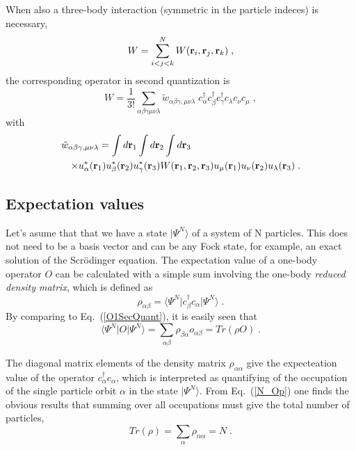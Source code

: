 When also a three-body interaction (symmetric in the particle indeces) is necessary,
\begin{equation}
 W = \sum_{i < j < k}^N W({\bf r}_i, {\bf r}_j, {\bf r}_k) \; ,
\label{W3}
\end{equation}
the corresponding operator in second quantization is
\begin{equation}
 W = \frac{1}{3!} \sum_{\alpha \beta \gamma \mu \nu \lambda}
    {\tilde w}_{\alpha \beta \gamma, \mu \nu \lambda}
      \; c^\dag_\alpha c^\dag_\beta c^\dag_\gamma  c_\lambda c_\nu c_\mu \; ,
\label{W3SecQuant}
\end{equation}
with
\begin{eqnarray}
\lefteqn{
 {\tilde w}_{\alpha \beta \gamma, \mu \nu \lambda} =
  \int d{\bf r}_1 \int d{\bf r}_2 \int d{\bf r}_3
} & &
\nonumber \\
 & & \times u^*_\alpha({\bf r}_1) u^*_\beta({\bf r}_2) u^*_\gamma({\bf r}_3)
             W({\bf r}_1, {\bf r}_2, {\bf r}_3) 
                 u_\mu({\bf r}_1) u_\nu({\bf r}_2) u_\lambda({\bf r}_3) \; .
\label{W3me} \\
\end{eqnarray}


\subsection{Expectation values}


Let's asume that that we have a state $\vert\Psi^N\rangle$ of a system of N particles. This does not need to be a basis vector and can be any Fock state, for example, an exact solution of the Scr\"odinger equation. The expectation value of a one-body operator $O$ can be calculated with a simple sum involving the one-body {\em reduced density matrix}, which is defined as
\begin{equation}
\rho_{\alpha \beta} = \langle \Psi^N\vert c^\dag_\beta c_\alpha \vert\Psi^N\rangle \; .
\label{OBRDM}
\end{equation}
By comparing to Eq.~(\ref{O1SecQuant}), it is easily seen that
\begin{equation}
\langle \Psi^N\vert O \vert\Psi^N\rangle = \sum_{\alpha \beta} \rho_{\beta \alpha}  o_{\alpha \beta} =
  Tr\left( \rho O \right)  \; .
\label{RhoExpVal}
\end{equation}

The diagonal matrix elements of the density matrix $\rho_{\alpha \alpha}$ give the expecteation value of the operator $c^\dag_\alpha c_\alpha$, which is interpreted as quantifying of the occupation of the single particle orbit $\alpha$ in the state $\vert\Psi^N\rangle$. From Eq.~(\ref{N_Op}) one finds the obvious results that summing over all occupations must give the total number of particles,
\begin{equation}
 Tr\left( \rho \right)  = \sum_\alpha \rho_{\alpha \alpha}  = N \; .
 \label{RhoOccN}
\end{equation}

